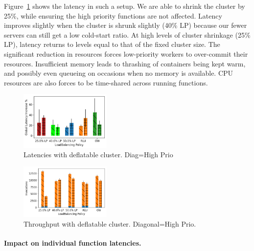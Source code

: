 Figure~\ref{fig:deflat-lat} shows the latency in such a setup.
We are able to shrink the cluster by 25\%, while ensuring the high priority functions are not affected.
Latency improves slightly when the cluster is shrunk slightly (40\% LP) because our fewer servers can still get a low cold-start ratio.
At high levels of cluster shrinkage (25\% LP), latency returns to levels equal to that of the fixed cluster size.
The significant reduction in resources forces low-priority workers to over-commit their resources.
Insufficient memory leads to thrashing of containers being kept warm, and possibly even queueing on occasions when no memory is available.
CPU resources are also forces to be time-shared across running functions.


\begin{figure}
  \centering \includegraphics[width=0.4\textwidth]{../Figures/deflat/openload-latencies-cntnorm.png}
  \caption{Latencies with deflatable cluster. Diag=High Prio}
  \label{fig:deflat-lat}
\end{figure}


\begin{figure}
  \centering
  \includegraphics[width=0.4\textwidth]{../Figures/deflat/openload-throughputs.png}
  \caption[fixed-tput]{Throughput with deflatable cluster. Diagonal=High Prio.}
  \label{fig:fixed-tput}
\end{figure}


\paragraph{Impact on individual function latencies.}

